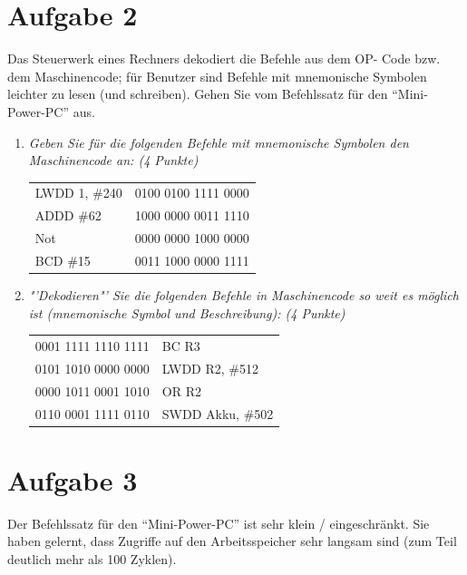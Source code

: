 \documentclass[10pt]{article}
\begin{document}
\section*{Aufgabe 2}
Das Steuerwerk eines Rechners dekodiert die Befehle aus dem OP- Code bzw. dem Maschinencode; für Benutzer sind Befehle mit mnemonische Symbolen leichter zu lesen (und schreiben). Gehen Sie vom Befehlssatz für den "`Mini-Power-PC"' aus.
\begin{enumerate}[label=\alph*)]
	\item
		\textit{Geben Sie für die folgenden Befehle mit mnemonische Symbolen den Maschinencode an: (4 Punkte)}
		
			\begin{tabular}[h]{l l}
				LWDD 1, \#240 & 0100 0100 1111 0000\\
				ADDD \#62 & 1000 0000 0011 1110\\
				Not & 0000 0000 1000 0000\\
				BCD \#15 & 0011 1000 0000 1111\\
			\end{tabular}
	
	\item
		\textit{"'Dekodieren"' Sie die folgenden Befehle in Maschinencode so weit es möglich ist (mnemonische Symbol und Beschreibung): (4 Punkte)}

			\begin{tabular}[h]{l l}
				0001 1111 1110 1111 & BC R3\\
				0101 1010 0000 0000 & LWDD R2, \#512 \\
				0000 1011 0001 1010 & OR R2 \\
				0110 0001 1111 0110 & SWDD Akku, \#502\\ %
			\end{tabular}

\end{enumerate}

\section*{Aufgabe 3}
Der Befehlssatz für den "`Mini-Power-PC"' ist sehr klein / eingeschränkt. Sie haben gelernt, dass Zugriffe auf den Arbeitsspeicher sehr langsam sind (zum Teil deutlich mehr als 100 Zyklen).
\end{document}
